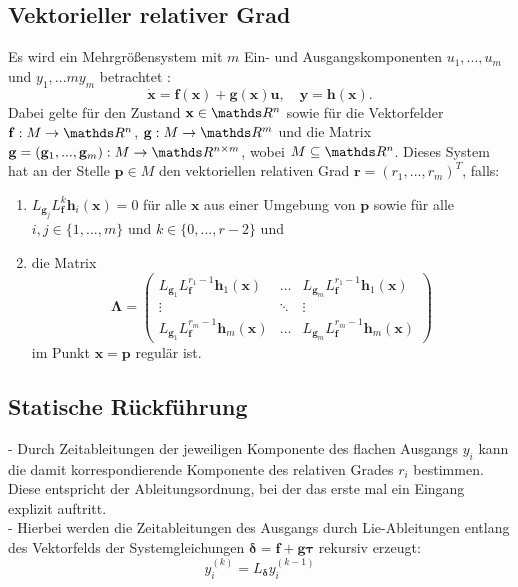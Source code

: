 \subsection{Vektorieller relativer Grad}
Es wird ein Mehrgrößensystem mit $m$ Ein- und Ausgangskomponenten $u_1, ..., u_m$ und $y_1, ...m y_m$ betrachtet \cite[S. 194]{NLRT_Roebenack}:
\begin{equation}
	\dot{\mathbf{x}} = \mathbf{f}(\mathbf{x}) + \mathbf{g}(\mathbf{x}) \mathbf{u}, \quad \mathbf{y} = \mathbf{h}(\mathbf{x}).
\end{equation}
Dabei gelte für den Zustand $\mathbf{x} \in \Reals^n$ sowie für die Vektorfelder $\mathbf{f}: M \rightarrow \Reals^n$, $\mathbf{g}: M \rightarrow \Reals^m$ und die Matrix $\mathbf{g} = (\mathbf{g}_1, ..., \mathbf{g}_m): M \rightarrow \Reals^{n \times m}$, wobei $M \subseteq \Reals^{n}$. Dieses System hat an der Stelle $\mathbf{p} \in M$ den vektoriellen relativen Grad $\mathbf{r} = (r_1, ..., r_m)^T$, falls:
\begin{enumerate}
	\item $L_{\mathbf{g}_j} L_{\mathbf{f}}^k \mathbf{h}_i(\mathbf{x}) = 0$ für alle $\mathbf{x}$ aus einer Umgebung von $\mathbf{p}$ sowie für alle $i,j \in \{1, ..., m\}$ und $k \in \{0, ..., r-2\}$ und
	\item die Matrix
	\begin{equation*}
		\mathbf{\Lambda} = 
		\left(\begin{matrix}
		L_{\mathbf{g}_1} L_{\mathbf{f}}^{r_1 -1} \mathbf{h}_1(\mathbf{x}) & \hdots & L_{\mathbf{g}_m} L_{\mathbf{f}}^{r_1 -1} \mathbf{h}_1(\mathbf{x}) \\
		\vdots & \ddots & \vdots \\
		L_{\mathbf{g}_1} L_{\mathbf{f}}^{r_m -1} \mathbf{h}_m(\mathbf{x}) & \hdots & L_{\mathbf{g}_m} L_{\mathbf{f}}^{r_m -1} \mathbf{h}_m(\mathbf{x})
		\end{matrix}\right) 
	\end{equation*}
	im Punkt $\mathbf{x} = \mathbf{p}$ regulär ist.
\end{enumerate}

\subsection{Statische Rückführung}
- Durch Zeitableitungen der jeweiligen Komponente des flachen Ausgangs $y_i$ kann die damit korrespondierende Komponente des relativen Grades $r_i$ bestimmen. Diese entspricht der Ableitungsordnung, bei der das erste mal ein Eingang explizit auftritt.\\
- Hierbei werden die Zeitableitungen des Ausgangs durch Lie-Ableitungen entlang des Vektorfelds der Systemgleichungen $\mathbf{\delta} = \mathbf{f} + \mathbf{g} \mathbf{\tau}$ rekursiv erzeugt: 
\begin{equation}
	y_i^{(k)} = L_{\mathbf{\delta}} y_i^{(k-1)}
\end{equation}

